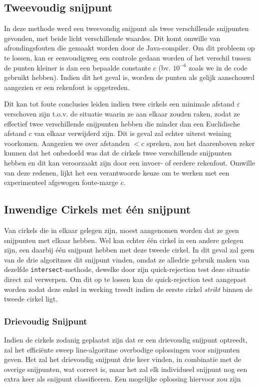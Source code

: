 \documentclass[12pt]{article}
\begin{document}
\subsection{Tweevoudig snijpunt}
In deze methode werd een tweevoudig snijpunt als twee verschillende snijpunten gevonden, met beide licht verschillende waardes. Dit komt omwille van afrondingsfouten die gemaakt worden door de Java-compiler. Om dit probleem op te lossen, kan er eenvoudigweg een controle gedaan worden of het verschil tussen de punten kleiner is dan een bepaalde constante $c$ (bv. $10^{-6}$ zoals we in de code gebruikt hebben). Indien dit het geval is, worden de punten als gelijk aanschouwd aangezien er een rekenfout is opgetreden. 

Dit kan tot foute conclusies leiden indien twee cirkels een minimale afstand $\varepsilon$ verschoven zijn t.o.v. de situatie waarin ze aan elkaar zouden raken, zodat ze effectief twee verschillende snijpunten hebben die minder dan een Euclidische afstand $c$ van elkaar verwijderd zijn. Dit is geval zal echter uiterst weining voorkomen. Aangezien we over afstanden $< c$ spreken, zou het daarenboven zeker kunnen dat het onbedoeld was dat de cirkels twee verschillende snijpunten hebben en dit kan veroorzaakt zijn door een invoer- of eerdere rekenfout. Omwille van deze redenen, lijkt het een verantwoorde keuze om te werken met een experimenteel afgewogen foute-marge $c$.

\subsection{Inwendige Cirkels met één snijpunt}
Van cirkels die in elkaar gelegen zijn, moest aangenomen worden dat ze geen snijpunten met elkaar hebben. Wel kan echter één cirkel in een andere gelegen zijn, een daarbij één snijpunt hebben met deze tweede cirkel. In dit geval zal geen van de drie algoritmes dit snijpunt vinden, omdat ze alledrie gebruik maken van dezelfde \texttt{intersect}-methode, dewelke door zijn quick-rejection test deze situatie direct zal verwerpen. Om dit op te lossen kan de quick-rejection test aangepast worden zodat deze enkel in werking treedt indien de eerste cirkel \textit{strikt} binnen de tweede cirkel ligt.

\subsubsection{Drievoudig Snijpunt}
Indien de cirkels zodanig geplaatst zijn dat er een drievoudig snijpunt optreedt, zal het efficiënte sweep line-algoritme overbodige oplossingen voor snijpunten geven. Het zal het drievoudig snijpunt drie keer vinden, in combinatie met de overige snijpunten, wat correct is, maar het zal elk individueel snijpunt nog een extra keer als snijpunt classificeren. Een mogelijke oplossing hiervoor zou zijn %
\end{document}
